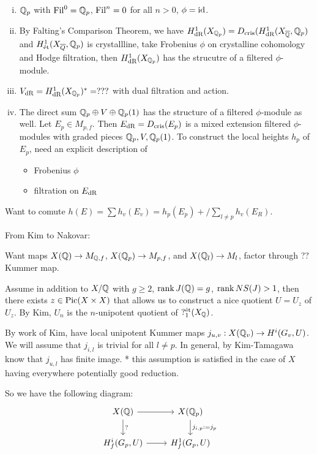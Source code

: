 \begin{ex}
\begin{enumerate}[(i)]
\item $\mathbb{Q}_p$ with $\operatorname{Fil}^0= \mathbb{Q}_p$, $\operatorname{Fil}^n=0$ for all $n>0$, $\phi= \operatorname{id}$. 
\item By Falting's Comparison Theorem, we have $H^1_{\text{dR}}(X_{\mathbb{Q}_p})= D_{\text{cris}}(H^1_{\text{dR}}(X_{\overline{\mathbb{Q}}}, \mathbb{Q}_p)$ and $H^1_{\text{\'et}}(X_{\overline{Q}},\mathbb{Q}_p)$ is crystallline, take Frobenius $\phi$ on crystalline cohomology and Hodge filtration, then $H^1_{\text{dR}}(X_{\mathbb{Q}_p})$ has the strucutre of a filtered $\phi$-module.

\item $V_{\text{dR}}= H^1_{\text{dR}}(X_{\mathbb{Q}_p})^*= ???$ with dual filtration and action.

\item The direct sum $\mathbb{Q}_p \oplus V \oplus \mathbb{Q}_p(1)$ has the structure of a filtered $\phi$-module as well. Let $E_p \in M_{p,f}$. Then $E_{\text{dR}}= D_{\text{cris}}(E_p)$ is a mixed extension filtered $\phi$-modules with graded pieces $\mathbb{Q}_p, V, \mathbb{Q}_p(1)$. To construct the local heights $h_p$ of $E_p$, need an explicit description of

\begin{itemize}
\item Frobenius $\phi$
\item filtration on $E_{\text{dR}}$
\end{itemize}
\end{enumerate}
\end{ex}


Want to comute $h(E)= \sum h_v(E_v)= h_p(E_p) + \slash{\sum_{l \neq p} h_v(E_R)}$.


From Kim to Nakovar:

Want maps $X(\mathbb{Q}) \to M_{\mathbb{Q},f}$, $X(\mathbb{Q}_p) \to M_{p,f}$, and $X(\mathbb{Q}_l) \to M_l$, factor through ?? Kummer map. 


Assume in addition to $X/\mathbb{Q}$ with $g \geq 2$, $\operatorname{rank} J(\mathbb{Q})= g$, $\operatorname{rank} NS(J) > 1$, then there exists $z \in \operatorname{Pic}(X \times X)$ that allows us to construct a nice quotient $U= U_z$ of $U_z$. By Kim, $U_n$ is the $n$-unipotent quotient of $?_1^{\text{\'et}}(X_{\mathbb{Q}})$.

By work of Kim, have local unipotent Kummer maps $j_{u,v}: X(\mathbb{Q}_v) \to H^i(G_v,U)$. We will assume that $j_{i,l}$ is trivial for all $l \neq p$. In general, by Kim-Tamagawa know that $j_{u,l}$ has finite image. * this assumption is satisfied in the case of $X$ having everywhere potentially good reduction. 


So we have the following diagram:
	\[
	\begin{tikzcd}
	X(\Q) \arrow{d}{?} \arrow{r} & X(\Q_p) \arrow{d}{j_{i,p}:= j_p} \\
	H_f^i (G_p,U) \arrow{r} & H_f^1(G_p,U)
	\end{tikzcd}
	\]


